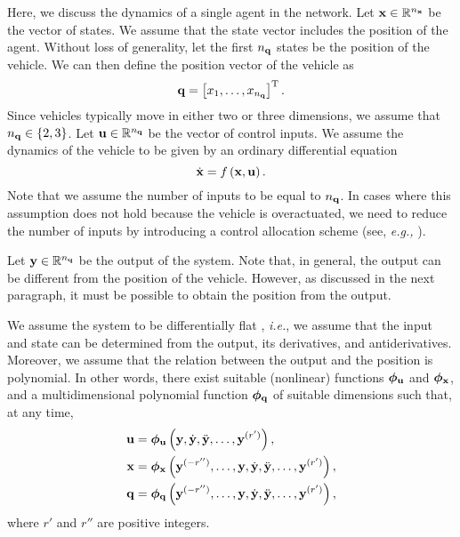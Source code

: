 Here, we discuss the dynamics of a single agent in the network. Let $\mathbf{x} \in \mathbb{R}^{n_{\mathbf{x}}}$ be the vector of states.
We assume that the state vector includes the position of the agent.
Without loss of generality, let the first $n_{\mathbf{q}}$ states be the position of the vehicle.
We can then define the position vector of the vehicle as
\begin{equation}
    \mathbf{q} = \left[x_1, \ldots, x_{n_{\mathbf{q}}}\right]^{\mathrm{T}}.
\end{equation}
Since vehicles typically move in either two or three dimensions, we assume that $n_{\mathbf{q}} \in \left\{2,3\right\}$.
Let $\mathbf{u} \in \mathbb{R}^{n_{\mathbf{q}}}$ be the vector of control inputs.
We assume the dynamics of the vehicle to be given by an ordinary differential equation
\begin{equation}
    \dot{\mathbf{x}} = f \left(\mathbf{x}, \mathbf{u}\right).
\label{equ:MPC_dynamics-of-an-agent}
\end{equation}
Note that we assume the number of inputs to be equal to $n_{\mathbf{q}}$.
In cases where this assumption does not hold because the vehicle is overactuated, we need to reduce the number of inputs by introducing a control allocation scheme (see, \emph{e.g.,} \cite{johansen_control_2013}).

Let $\mathbf{y} \in \mathbb{R}^{n_{\mathbf{q}}}$ be the output of the system.
Note that, in general, the output can be different from the position of the vehicle.
However, as discussed in the next paragraph, it must be possible to obtain the position from the output.

We assume the system to be differentially flat \cite{fliess_1995_flatness}, \emph{i.e.}, we assume that the input and state can be determined from the output, its derivatives, and antiderivatives. Moreover, we assume that the relation between the output and the position is polynomial.
In other words, there exist suitable (nonlinear) functions $\bm{\phi}_{\mathbf{u}}$ and $\bm{\phi}_{\mathbf{x}}$, and a multidimensional polynomial function $\bm{\phi}_{\mathbf{q}}$ of suitable dimensions such that, at any time,
%
\begin{align}
    \mathbf{u} &= \bm{\phi}_{\mathbf{u}} \left(\mathbf{y}, \dot{\mathbf{y}}, \ddot{\mathbf{y}}, \ldots, \mathbf{y}^{(r')}\right), \label{eq:MPC_phi_u} \\
    \mathbf{x} &= \bm{\phi}_{\mathbf{x}} \left(\mathbf{y}^{(-r'')}, \ldots, \mathbf{y}, \dot{\mathbf{y}}, \ddot{\mathbf{y}}, \ldots, \mathbf{y}^{(r')}\right), \label{eq:MPC_phi_x} \\ 
    \mathbf{q} &= \bm{\phi}_{\mathbf{q}} \left(\mathbf{y}^{(-r'')}, \ldots, \mathbf{y}, \dot{\mathbf{y}}, \ddot{\mathbf{y}}, \ldots, \mathbf{y}^{(r')}\right), \label{eq:MPC_phi_q}
\end{align}
%
where $r'$ and $r''$ are positive integers.


